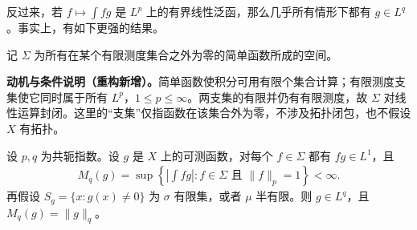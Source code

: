 \documentclass[../../main.tex]{subfiles}
\begin{document}
反过来，若 $f\mapsto\int fg$ 是 $L^p$ 上的有界线性泛函，那么几乎所有情形下都有 $g\in L^q$。事实上，有如下更强的结果。
\begin{definition}[有限测度支集的简单函数空间]\label{definition:ch06-finite-support-simple-space}
记 $\Sigma$ 为所有在某个有限测度集合之外为零的简单函数所成的空间。
\end{definition}
\begin{remark}
\textbf{动机与条件说明（重构新增）。}简单函数使积分可用有限个集合计算；有限测度支集使它同时属于所有 $L^p$，$1\leqslant p\leqslant\infty$。两支集的有限并仍有有限测度，故 $\Sigma$ 对线性运算封闭。这里的“支集”仅指函数在该集合外为零，不涉及拓扑闭包，也不假设 $X$ 有拓扑。
\end{remark}
\begin{theorem}\label{theorem:ch06-dual-test-criterion}
设 $p,q$ 为共轭指数。设 $g$ 是 $X$ 上的可测函数，对每个 $f\in\Sigma$ 都有 $fg\in L^1$，且
\begin{align*}
M_q(g)=\sup\left\{\left|\int fg\right|:f\in\Sigma\text{ 且 }\|f\|_p=1\right\}<\infty.
\end{align*}
再假设 $S_g=\{x:g(x)\ne0\}$ 为 $\sigma$ 有限集，或者 $\mu$ 半有限。则 $g\in L^q$，且 $M_q(g)=\|g\|_q$。
\end{theorem}
\end{document}
